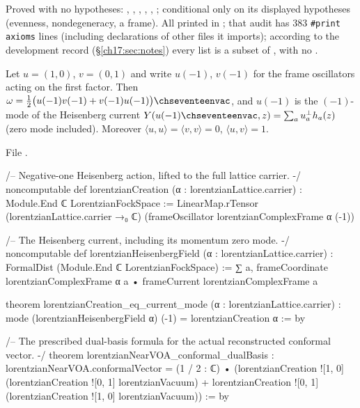 \begin{status}
Proved with no hypotheses: , ,
, , ,
;  conditional only on its displayed
hypotheses (evenness, nondegeneracy, a frame).  All printed in
; that audit has 383 \texttt{\#print axioms} lines (including declarations of other files it imports); according to
the development record (\S\ref{ch17:sec:notes}) every list is a subset of
, with no .
\end{status}

\begin{theorem}\label{ch17:thm:dualbasis}
Let $u=(1,0)$, $v=(0,1)$ and write $u(-1)$, $v(-1)$ for the frame oscillators acting on the first factor.
Then $\omega=\tfrac12\bigl(u(-1)v(-1)+v(-1)u(-1)\bigr)\chseventeenvac$, and $u(-1)$ is the $(-1)$-mode of the Heisenberg
current $Y(u(-1)\chseventeenvac,z)=\sum_au^\perp_ah_a(z)$ (zero mode included).  Moreover
$\langle u,u\rangle=\langle v,v\rangle=0$, $\langle u,v\rangle=1$.
\end{theorem}

\noindent File .
\begin{leancode}
/-- Negative-one Heisenberg action, lifted to the full lattice carrier. -/
noncomputable def lorentzianCreation (α : lorentzianLattice.carrier) :
    Module.End ℂ LorentzianFockSpace :=
  LinearMap.rTensor (lorentzianLattice.carrier →₀ ℂ)
    (frameOscillator lorentzianComplexFrame α (-1))

/-- The Heisenberg current, including its momentum zero mode. -/
noncomputable def lorentzianHeisenbergField (α : lorentzianLattice.carrier) :
    FormalDist (Module.End ℂ LorentzianFockSpace) :=
  ∑ a, frameCoordinate lorentzianComplexFrame α a • frameCurrent lorentzianComplexFrame a

theorem lorentzianCreation_eq_current_mode (α : lorentzianLattice.carrier) :
    mode (lorentzianHeisenbergField α) (-1) = lorentzianCreation α := by

/-- The prescribed dual-basis formula for the actual reconstructed conformal vector. -/
theorem lorentzianNearVOA_conformal_dualBasis :
    lorentzianNearVOA.conformalVector = (1 / 2 : ℂ) •
      (lorentzianCreation ![1, 0] (lorentzianCreation ![0, 1] lorentzianVacuum) +
       lorentzianCreation ![0, 1] (lorentzianCreation ![1, 0] lorentzianVacuum)) := by
\end{leancode}


